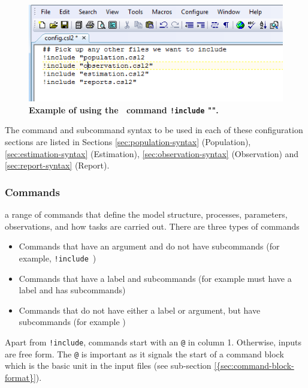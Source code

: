\vspace*{3mm}
\begin{figure}[htp]
	\includegraphics[scale=1]{Figures/config.png}
	\caption{\textbf{Example of using the \config~command \texttt{!include}
	 "".}}\label{fig:config_file_1}
\end{figure}

The command and subcommand syntax to be used in each of these configuration sections are listed in Sections \ref{sec:population-syntax} (Population), \ref{sec:estimation-syntax} (Estimation), \ref{sec:observation-syntax} (Observation) and \ref{sec:report-syntax} (Report).

\subsubsection{Commands}

\CNAME\has a range of commands that define the model structure, processes, parameters, observations, and how tasks are carried out. There are three types of commands

\begin{itemize}
\item Commands that have an argument and do not have subcommands (for example, \texttt{!include}\ )
\item Commands that have a label and subcommands (for example  must have a label and has subcommands)
\item Commands that do not have either a label or argument, but have subcommands (for example )
\end{itemize}

Apart from \texttt{!include}, commands start with an \texttt{@} in column 1. Otherwise, inputs are free form. The \texttt{@} is important as it signals the start of a command block which is the basic  unit in the input files (see sub-section \ref{{sec:command-block-format}}).

